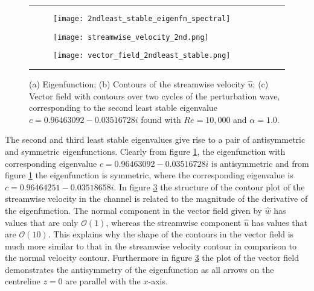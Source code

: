 \documentclass[a4paper, 12pt, twoside, openright]{article}
\numberwithin{equation}{section}
\begin{document}
\begin{figure}[H]
\rule{\linewidth}{1.5pt}
\begin{subfigure}[b]{0.5\textwidth}
\texttt{[image: 2ndleast\_stable\_eigenfn\_spectral]}\hfill
\caption{\label{fig:2ndleast_stable_eigenfn_spectral}}
\end{subfigure}
\begin{subfigure}[b]{0.5\textwidth}
\texttt{[image: streamwise\_velocity\_2nd.png]}\hfill
\caption{\label{fig:streamwise_velocity_2nd}}
\end{subfigure}
\begin{subfigure}[b]{1.0\textwidth}
\texttt{[image: vector\_field\_2ndleast\_stable.png]}\hfill
\caption{\label{fig:vector_field_2ndleast_stable}}
\end{subfigure}
\caption{(a) Eigenfunction; (b) Contours of the streamwise velocity $\hat u$; (c) Vector field with contours over two cycles of the perturbation wave, corresponding to the second least stable eigenvalue $c =  0.96463092 - 0.03516728i$ found with $Re=10,000$ and $\alpha=1.0$.\label{fig:2ndleaststable_spectral}}
\rule{\linewidth}{1.5pt}
\end{figure}

The second and third least stable eigenvalues give rise to a pair of antisymmetric and symmetric eigenfunctions. Clearly from figure \ref{fig:2ndleast_stable_eigenfn_spectral}, the eigenfunction with corresponding eigenvalue $c =  0.96463092 - 0.03516728i$ is antisymmetric and from figure \ref{fig:2ndleast_stable_eigenfn_spectral} the eigenfunction is symmetric, where the corresponding eigenvalue is $c = 0.96464251 - 0.03518658i$. In figure \ref{fig:vector_field_2ndleast_stable} the structure of the contour plot of the streamwise velocity in the channel is related to the magnitude of the derivative of the eigenfunction. The normal component in the vector field given by $\hat w$ has values that are only $\mathcal{O}(1)$, whereas the streamwise component $\hat u$ has values that are $\mathcal{O}(10)$. This explains why the shape of the contours in the vector field is much more similar to that in the streamwise velocity contour in comparison to the normal velocity contour. Furthermore in figure \ref{fig:vector_field_2ndleast_stable} the plot of the vector field demonstrates the antisymmetry of the eigenfunction as all arrows on the centreline $z=0$ are parallel with the $x$-axis.       
\end{document}
